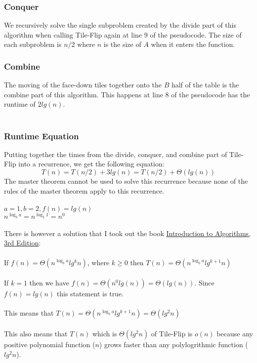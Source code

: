 \documentclass[12pt]{article}
\begin{document}
\subsubsection*{Conquer}
We recursively solve the single subproblem created by the divide part of this algorithm when calling Tile-Flip again at line 9 of the pseudocode.  The size of each subproblem is $n/2$ where $n$ is the size of $A$ when it enters the function.\\   
\subsubsection*{Combine}
The moving of the face-down tiles together onto the $B$ half of the table is the combine part of this algorithm.  This happens at line 8 of the pseudocode has the runtime of $2lg(n)$.\\
\\
\subsubsection*{Runtime Equation}
\noindent
Putting together the times from the divide, conquer, and combine part of Tile-Flip into a recurrence, we get the following equation:
$$
T(n) = T(n/2) + 3lg(n) = T(n/2) + \Theta{(lg(n))}
$$
The master theorem cannot be used to solve this recurrence because none of the rules of the master theorem apply to this recurrence.\\
\\
$a=1, b=2, f(n) = lg(n)$\\
$n^{\log_{b} a} = n^{\log_{2} 1} = n^0$\\
\\
There is however a solution that I took out the book \underline{Introduction to Algorithms, 3rd Edition}:\\
\\
If $f(n) = \Theta{(n^{\log_{b} a}lg^k n)}$, where $k \ge 0$ then $T(n) = \Theta{(n^{\log_{b} a}lg^{k+1} n)}$\\
\\
If $k=1$ then we have $f(n) = \Theta{(n^0lg(n))} = \Theta{(lg(n))}$.  Since $f(n) = lg(n)$ this statement is true.\\
\\
This means that $T(n) = \Theta{(n^{\log_{b} a}lg^{k+1} n)} = \Theta{(lg^{2} n)}$\\
\\
This also means that $T(n)$ which is $ \Theta{(lg^{2} n)}$ of Tile-Flip is $o(n)$ because any positive polynomial function ($n$) grows faster than any polylogrithmic function ($lg^2 n$).
\end{document}
